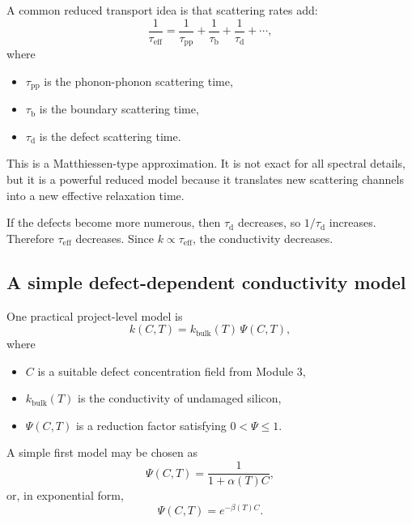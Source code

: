 \documentclass[11pt]{article}
\begin{document}
A common reduced transport idea is that scattering rates add:
\begin{equation}
\frac{1}{\tau_{\mathrm{eff}}} = \frac{1}{\tau_{\mathrm{pp}}} + \frac{1}{\tau_{\mathrm{b}}} + \frac{1}{\tau_{\mathrm{d}}} + \cdots,
\end{equation}
where
\begin{itemize}
    \item $\tau_{\mathrm{pp}}$ is the phonon-phonon scattering time,
    \item $\tau_{\mathrm{b}}$ is the boundary scattering time,
    \item $\tau_{\mathrm{d}}$ is the defect scattering time.
\end{itemize}

This is a Matthiessen-type approximation. It is not exact for all spectral details, but it is a powerful reduced model because it translates new scattering channels into a new effective relaxation time.

If the defects become more numerous, then $\tau_{\mathrm{d}}$ decreases, so $1/\tau_{\mathrm{d}}$ increases. Therefore $\tau_{\mathrm{eff}}$ decreases. Since $k\propto \tau_{\mathrm{eff}}$, the conductivity decreases.

\subsection{A simple defect-dependent conductivity model}

One practical project-level model is
\begin{equation}
 k(C,T) = k_{\mathrm{bulk}}(T)\, \Psi(C,T),
\end{equation}
where
\begin{itemize}
    \item $C$ is a suitable defect concentration field from Module 3,
    \item $k_{\mathrm{bulk}}(T)$ is the conductivity of undamaged silicon,
    \item $\Psi(C,T)$ is a reduction factor satisfying $0<\Psi\le 1$.
\end{itemize}

A simple first model may be chosen as
\begin{equation}
 \Psi(C,T) = \frac{1}{1+\alpha(T) C},
\end{equation}
or, in exponential form,
\begin{equation}
 \Psi(C,T) = e^{-\beta(T) C}.
\end{equation}
\end{document}
